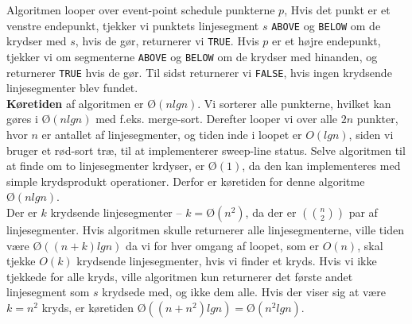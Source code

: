 Algoritmen looper over event-point schedule punkterne $p$, Hvis det punkt er et venstre endepunkt, tjekker vi punktets linjesegment $s$ \texttt{ABOVE} og \texttt{BELOW} om de krydser med $s$, hvis de gør, returnerer vi \texttt{TRUE}. Hvis $p$ er et højre endepunkt, tjekker vi om segmenterne \texttt{ABOVE} og \texttt{BELOW} om de krydser med hinanden, og returnerer \texttt{TRUE} hvis de gør. Til sidst returnerer vi \texttt{FALSE}, hvis ingen krydsende linjesegmenter blev fundet.\\

\textbf{Køretiden} af algoritmen er $Ø(nlgn)$. Vi sorterer alle punkterne, hvilket kan gøres i $Ø(nlgn)$ med f.eks. merge-sort. Derefter looper vi over alle $2n$ punkter, hvor $n$ er antallet af linjesegmenter, og tiden inde i loopet er $O(lgn)$, siden vi bruger et rød-sort træ, til at implementerer sweep-line status. Selve algoritmen til at finde om to linjesegmenter krdyser, er $Ø(1)$, da den kan implementeres med simple krydsprodukt operationer. Derfor er køretiden for denne algoritme $Ø(nlgn)$.\\

Der er $k$ krydsende linjesegmenter -- $k = Ø(n^2)$, da der er $(n \choose 2)$ par af linjesegmenter. Hvis algoritmen skulle returnerer alle linjesegmenterne, ville tiden være $Ø((n+k)lgn)$ da vi for hver omgang af loopet, som er $O(n)$, skal tjekke $O(k)$ krydsende linjesegmenter, hvis vi finder et kryds. Hvis vi ikke tjekkede for alle kryds, ville algoritmen kun returnerer det første andet linjesegment som $s$ krydsede med, og ikke dem alle. Hvis der viser sig at være $k = n^2$ kryds, er køretiden $Ø((n + n^2)lgn) = Ø(n^2lgn)$.
